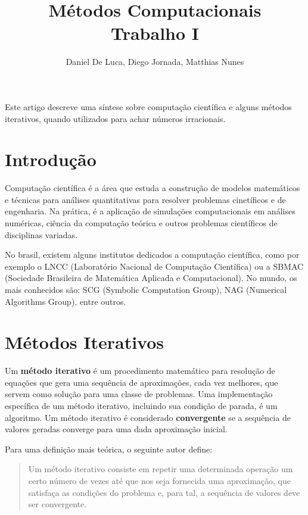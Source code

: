 \documentclass[a4paper]{article}
\author{Daniel De Luca, Diego Jornada, Matthias Nunes}
\title{Métodos Computacionais \\ Trabalho I}
\begin{document}
\maketitle

\begin{resumo}

Este artigo descreve uma síntese sobre computação científica e alguns métodos
iterativos, quando utilizados para achar números irracionais.

\end{resumo}

\section{Introdução}

Computação científica é a área que estuda a construção de modelos matemáticos e
técnicas para análises quantitativas para resolver problemas cinetíficos e de
engenharia. Na prática, é a aplicação de simulações computacionais em análises
numéricas, ciência da computação teórica e outros problemas científicos de
disciplinas variadas.

No brasil, existem alguns institutos dedicados a computação científica, como por
exemplo o LNCC (Laboratório Nacional de Computação Científica) ou a SBMAC
(Sociedade Brasileira de Matemática Aplicada e Computacional). No mundo, os mais
conhecidos são: SCG (Symbolic Computation Group), NAG (Numerical Algorithms
Group), entre outros.

\section{Métodos Iterativos}

Um \textbf{método iterativo} é um procedimento matemático para resolução de equações que gera uma sequência de aproximações, cada vez melhores, que servem como solução para uma classe de problemas. Uma implementação específica de um método iterativo, incluindo sua condição de parada, é um algoritmo. Um método iterativo é considerado \textbf{convergente} se a sequência de valores geradas converge para uma dada aproximação inicial.

Para uma definição mais teórica, o seguinte autor define:

\begin{quotation}
Um método iterativo consiste em repetir uma determinada operação um certo número de vezes até que nos seja fornecida uma aproximação, que satisfaça as condições do problema e, para tal, a sequência de valores deve ser convergente.\cite{batista2014metodos}

\end{quotation}
\end{document}
